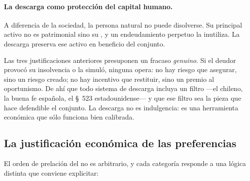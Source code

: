\paragraph{La descarga como protección del capital humano.} A diferencia de la sociedad, la persona
natural no puede disolverse. Su principal activo no es patrimonial sino su
, y un endeudamiento perpetuo la inutiliza. La descarga
preserva ese activo en beneficio del conjunto.

\begin{foco}
Las tres justificaciones anteriores presuponen un fracaso \emph{genuino}. Si el deudor provocó su
insolvencia o la simuló, ninguna opera: no hay riesgo que asegurar, sino un riesgo creado; no hay
incentivo que restituir, sino un premio al oportunismo. De ahí que todo sistema de descarga incluya
un filtro ---el  chileno, la buena fe española, el \S~523 estadounidense--- y que ese
filtro sea la pieza que hace defendible el conjunto. La descarga no es indulgencia: es una
herramienta económica que sólo funciona bien calibrada.
\end{foco}

\subsection{La justificación económica de las preferencias}

El orden de prelación del  no es arbitrario, y cada categoría responde a una lógica
distinta que conviene explicitar:


